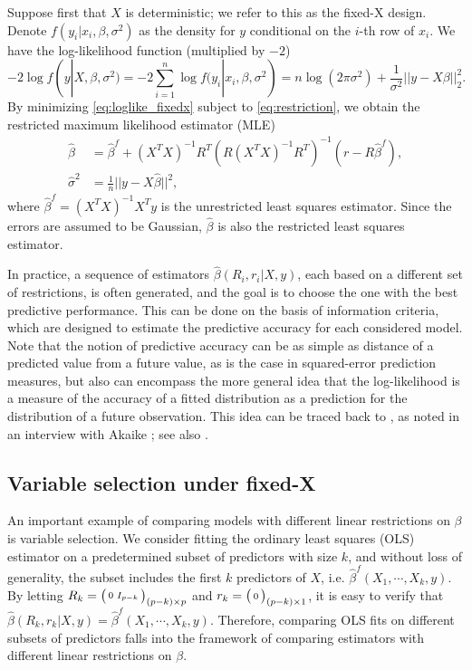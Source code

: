 Suppose first that $X$ is deterministic; we refer to this as the fixed-X design. Denote $f(y_i|x_i,\beta,\sigma^2)$ as the density for $y$ conditional on the $i$-th row of $x_i$. We have the log-likelihood function (multiplied by $-2$)
\begin{equation}
-2 \log f(y|X,\beta,\sigma^2) = -2 \sum_{i=1}^n \log f(y_i|x_i,\beta,\sigma^2) = n \log (2\pi \sigma^2) + \frac{1}{\sigma^2} || y-X\beta||_2^2.
\label{eq:loglike_fixedx}
\end{equation}
By minimizing \eqref{eq:loglike_fixedx} subject to \eqref{eq:restriction}, we obtain the restricted maximum likelihood estimator (MLE)
\begin{equation}
\begin{aligned}
\hat{\beta} &= \hat{\beta}^f + (X^T X)^{-1} R^T ( R(X^T X)^{-1} R^T)^{-1} (r-R \hat{\beta}^f),\\ 
\hat \sigma^2 &= \frac{1}{n} ||y-X \hat{\beta}||^2, 
\end{aligned}
\label{eq:betahat_sigmahatsq}
\end{equation}
where $\hat{\beta}^f = (X^T X)^{-1} X^T y$ is the unrestricted least squares estimator. Since the errors are assumed to be Gaussian, $\hat\beta$ is also the restricted least squares estimator. 

In practice, a sequence of estimators $\hat\beta(R_i,r_i|X,y)$, each based on a different set of restrictions, is often generated, and the goal is to choose the one with the best predictive performance. This can be done on the basis of information criteria, which are designed to estimate the predictive accuracy for each considered model. Note that the notion of predictive accuracy can be as simple as distance of a predicted value from a future value, as is the case in squared-error prediction measures, but also can encompass the more general idea that the log-likelihood is a measure of the accuracy of a fitted distribution as a prediction for the distribution of a future observation. This idea can be traced back to \citet{Akaike1973}, as noted in an interview with Akaike \citep{findley1995conversation}; see also \citet{efron1986biased}. 

\subsection{Variable selection under fixed-X}
\label{sec:intro_subsetselection}
An important example of comparing models with different linear restrictions on $\beta$ is variable selection. We consider fitting the ordinary least squares (OLS) estimator on a predetermined subset of predictors with size $k$, and without loss of generality, the subset includes the first $k$ predictors of $X$, i.e. $\hat\beta^f(X_1,\cdots,X_k,y)$. By letting $R_k= \big(\begin{smallmatrix}0 & I_{p-k}\end{smallmatrix}\big)_{(p-k) \times p} $ and $r_k = \big(\begin{smallmatrix}0\end{smallmatrix}\big)_{(p-k) \times 1}$, it is easy to verify that $\hat{\beta}(R_k,r_k|X,y)=\hat\beta^f(X_1,\cdots,X_k,y)$. Therefore, comparing OLS fits on different subsets of predictors falls into the framework of comparing estimators with different linear restrictions on $\beta$.

